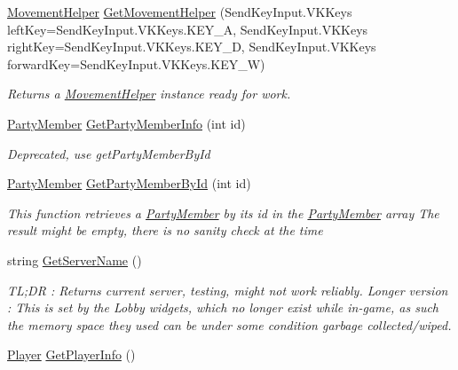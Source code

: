 \begin{DoxyCompactItemize}
\item 
\hyperlink{classffxivlib_1_1_movement_helper}{Movement\-Helper} \hyperlink{classffxivlib_1_1_f_f_x_i_v_l_i_b_a889468d923f65d7ae6ac52135048c1d6}{Get\-Movement\-Helper} (Send\-Key\-Input.\-V\-K\-Keys left\-Key=Send\-Key\-Input.\-V\-K\-Keys.\-K\-E\-Y\-\_\-\-A, Send\-Key\-Input.\-V\-K\-Keys right\-Key=Send\-Key\-Input.\-V\-K\-Keys.\-K\-E\-Y\-\_\-\-D, Send\-Key\-Input.\-V\-K\-Keys forward\-Key=Send\-Key\-Input.\-V\-K\-Keys.\-K\-E\-Y\-\_\-\-W)
\begin{DoxyCompactList}\small\item\em Returns a \hyperlink{classffxivlib_1_1_movement_helper}{Movement\-Helper} instance ready for work. \end{DoxyCompactList}\item 
\hyperlink{classffxivlib_1_1_party_member}{Party\-Member} \hyperlink{classffxivlib_1_1_f_f_x_i_v_l_i_b_a4c0f7a81a068c9ff5b668ff22a7e15d4}{Get\-Party\-Member\-Info} (int id)
\begin{DoxyCompactList}\small\item\em Deprecated, use get\-Party\-Member\-By\-Id \end{DoxyCompactList}\item 
\hyperlink{classffxivlib_1_1_party_member}{Party\-Member} \hyperlink{classffxivlib_1_1_f_f_x_i_v_l_i_b_aae35e1fac36dcac4b4c0ad42550f918d}{Get\-Party\-Member\-By\-Id} (int id)
\begin{DoxyCompactList}\small\item\em This function retrieves a \hyperlink{classffxivlib_1_1_party_member}{Party\-Member} by its id in the \hyperlink{classffxivlib_1_1_party_member}{Party\-Member} array The result might be empty, there is no sanity check at the time \end{DoxyCompactList}\item 
string \hyperlink{classffxivlib_1_1_f_f_x_i_v_l_i_b_ae9550203b3b309168034af53f505f39d}{Get\-Server\-Name} ()
\begin{DoxyCompactList}\small\item\em T\-L;D\-R \-: Returns current server, testing, might not work reliably. Longer version \-: This is set by the Lobby widgets, which no longer exist while in-\/game, as such the memory space they used can be under some condition garbage collected/wiped. \end{DoxyCompactList}\item 
\hyperlink{classffxivlib_1_1_player}{Player} \hyperlink{classffxivlib_1_1_f_f_x_i_v_l_i_b_a66e0eb2208e2d9332633ca9476976d53}{Get\-Player\-Info} ()

\end{DoxyCompactItemize}
